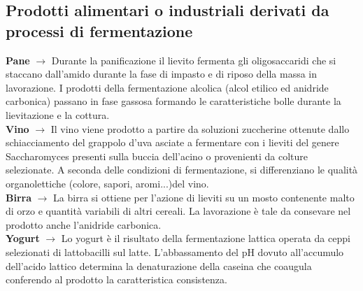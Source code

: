 \subsection{Prodotti alimentari o industriali derivati da processi di fermentazione}
\textbf{Pane} $\xrightarrow{}$ Durante la panificazione il lievito fermenta gli oligosaccaridi che si staccano dall'amido durante la fase di impasto e di riposo della massa in lavorazione. I prodotti della fermentazione alcolica (alcol etilico ed anidride carbonica) passano in fase gassosa formando le caratteristiche bolle durante la lievitazione e la cottura.
\\\textbf{Vino} $\xrightarrow{}$ Il vino viene prodotto a partire da soluzioni zuccherine ottenute dallo schiacciamento del grappolo d'uva asciate a fermentare con i lieviti del genere Saccharomyces presenti sulla buccia dell'acino o provenienti da colture selezionate. A seconda delle condizioni di fermentazione, si differenziano le qualit\`a organolettiche (colore, sapori, aromi...)del vino.
\\\textbf{Birra} $\xrightarrow{}$ La birra si ottiene per l'azione di lieviti su un mosto contenente malto di orzo e quantit\`a variabili di altri cereali. La lavorazione \`e tale da consevare nel prodotto anche l'anidride carbonica.
\\\textbf{Yogurt} $\xrightarrow{}$ Lo yogurt \`e il risultato della fermentazione lattica operata da ceppi selezionati di lattobacilli sul latte. L'abbassamento del pH dovuto all'accumulo dell'acido lattico determina la denaturazione della caseina che coaugula conferendo al prodotto la caratteristica consistenza.
